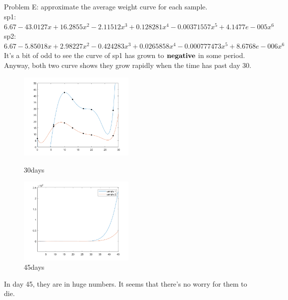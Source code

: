 \documentclass[12pt,letterpaper]{article}
\begin{document}
  \subsection*{}
    Problem E: approximate the average weight curve for each sample.\\
    sp1:$6.67-43.0127x+16.2855x^{2}-2.11512x^{3}+0.128281x^{4}-0.00371557x^{5}+4.1477e-005x^{6}$\\
    sp2:$6.67-5.85018x+2.98227x^{2}-0.424283x^{3}+0.0265858x^{4}-0.000777473x^{5}+8.6768e-006x^{6}$\\
    It's a bit of odd to see the curve of sp1 has grown to $\bf{negative}$ in some period. 
    Anyway, both two curve shows they grow rapidly when the time has past day 30. 
    \begin{figure}[h]
      \begin{minipage}[t]{0.5\linewidth}
      \centering
      \includegraphics[width=2.2in]{pic/E.png}
      \caption{30days}
      \label{fig:side:a}
      \end{minipage}%
      \begin{minipage}[t]{0.5\linewidth}
      \centering
      \includegraphics[width=2.2in]{pic/E_1.png}
      \caption{45days}
      \label{fig:side:b}
      \end{minipage}
    \end{figure}
    In day 45, they are in huge numbers. It seems that there's no worry for them to die.
\end{document}
